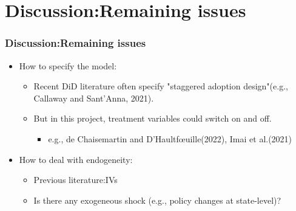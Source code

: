 \documentclass{beamer}
\begin{document}
\section{Discussion:Remaining issues}
    \begin{frame}\frametitle{Discussion:Remaining issues}
        \begin{itemize}
            \item How to specify the model:
            \begin{itemize}
                \item Recent DiD literature often specify "staggered adoption design"(e.g., Callaway and Sant'Anna, 2021).
                \item But in this project, treatment variables could switch on and off.
                \begin{itemize}
                    \item e.g., de Chaisemartin and D'Haultfœuille(2022), Imai et al.(2021)
                \end{itemize}
            \end{itemize}
            \item How to deal with endogeneity:
            \begin{itemize}
                \item Previous literature:IVs
                \item Is there any exogeneous shock (e.g., policy changes at state-level)?
            \end{itemize}
        \end{itemize}
    \end{frame}

            
\end{document}
